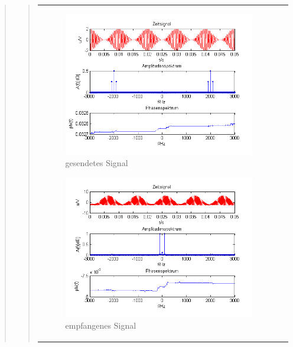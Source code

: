 \begin{quote}
\begin{quote}
\begin{center}
\begin{tabular}{ll}
\begin{minipage}{0.67\textwidth}
                \begin{figure}[H]
                    \label{fig:DemocosinusoT}
                    \includegraphics[scale=0.7]{Bilder/Am_Cos_2k_100Hz_mo}
                    \caption{gesendetes Signal}
                \end{figure}
        
            \end{minipage}
        
            \begin{minipage}{0.67\textwidth}
                \begin{figure}[H]
                    \label{fig:DemocosinusoT2}
                    \includegraphics[scale=0.7]{Bilder/Demo_Sin_2k_100Hz_mo_ohneTiefpass}
                    \caption{empfangenes Signal}
                \end{figure}
        

\end{minipage}
\end{tabular}
\end{center}
\end{quote}
\end{quote}
